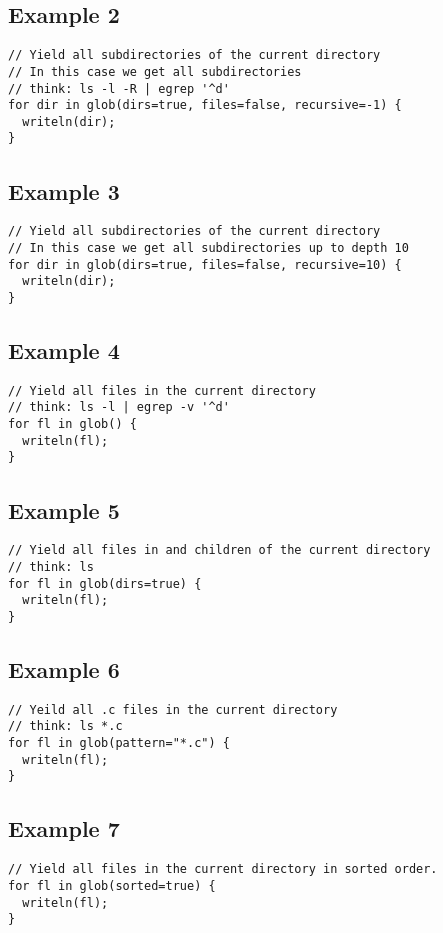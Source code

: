 \documentclass{article}
\begin{document}
\subsection{Example 2}
\begin{lstlisting}
// Yield all subdirectories of the current directory
// In this case we get all subdirectories
// think: ls -l -R | egrep '^d'
for dir in glob(dirs=true, files=false, recursive=-1) {
  writeln(dir);
}
\end{lstlisting}

\subsection{Example 3}
\begin{lstlisting}
// Yield all subdirectories of the current directory
// In this case we get all subdirectories up to depth 10
for dir in glob(dirs=true, files=false, recursive=10) {
  writeln(dir);
}
\end{lstlisting}

\subsection{Example 4}
\begin{lstlisting}
// Yield all files in the current directory
// think: ls -l | egrep -v '^d'
for fl in glob() {
  writeln(fl);
}
\end{lstlisting}

\subsection{Example 5}
\begin{lstlisting}
// Yield all files in and children of the current directory
// think: ls
for fl in glob(dirs=true) {
  writeln(fl);
}
\end{lstlisting}

\subsection{Example 6}
\begin{lstlisting}
// Yeild all .c files in the current directory
// think: ls *.c
for fl in glob(pattern="*.c") {
  writeln(fl);
}
\end{lstlisting}

\subsection{Example 7}
\begin{lstlisting}
// Yield all files in the current directory in sorted order.
for fl in glob(sorted=true) {
  writeln(fl);
}
\end{lstlisting}
\end{document}
